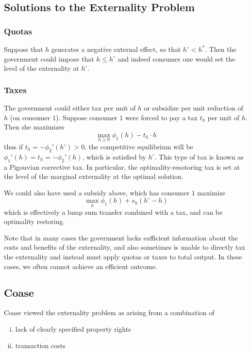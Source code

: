 \subsection{Solutions to the Externality Problem}
\label{sec:solut-extern-probl}

\subsubsection{Quotas}

Suppose that $h$ generates a negative external effect, so that
$h^\circ < h^*$. Then the government could impose that $h \leq
h^\circ$ and indeed consumer one would set the level of the
externality at $h^\circ$.

\subsubsection{Taxes}

The government could either tax per unit of $h$ or subsidize per unit
reduction of $h$ (on consumer $1$). Suppose consumer $1$ were forced
to pay a tax $t_h$ per unit of $h$. Then she maximizes
\[
\max_{h \geq 0} \phi_1(h) - t_h \cdot h
\]
thus if $t_h = - \phi_2'(h^\circ) > 0$, the competitive equilibrium
will be $\phi_1'(h) = t_h = -\phi_2'(h)$, which is satisfied by
$h^\circ$. This type of tax is known as a Pigouvian corrective tax. In
particular, the optimality-resotoring tax is set at the level of the
marginal externality at the optimal solution.

We could also have used a subsidy above, which has consumer $1$
maximize
\[
\max_h \phi_1(h) + s_h(h^\circ - h)
\]
which is effectively a lump sum transfer combined with a tax, and can
be optimality restoring.

Note that in many cases the government lacks sufficient information
about the costs and benefits of the externality, and also sometimes is
unable to directly tax the externality and instead must apply quotas
or taxes to total output. In these cases, we often cannot achieve an
efficient outcome.

\subsection{Coase}
\label{sec:coase}

Coase viewed the externality problem as arising from a combination of
\begin{enumerate}[(i)]
\item lack of clearly specified property rights
\item transaction costs
\end{enumerate}


